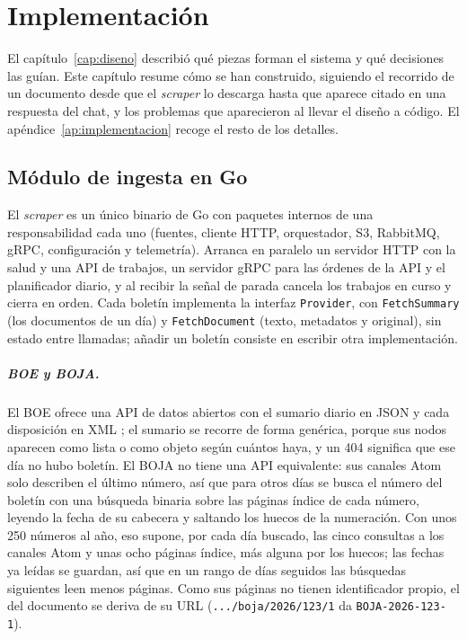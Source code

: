 \chapter{Implementación}
\label{cap:implementacion}

El capítulo~\ref{cap:diseno} describió qué piezas forman el sistema y qué decisiones las guían. Este capítulo resume cómo se han construido, siguiendo el recorrido de un documento desde que el \emph{scraper} lo descarga hasta que aparece citado en una respuesta del chat, y los problemas que aparecieron al llevar el diseño a código. El apéndice~\ref{ap:implementacion} recoge el resto de los detalles.

\section{Módulo de ingesta en Go}
\label{sec:impl-go}

El \emph{scraper} es un único binario de Go \cite{golang} con paquetes internos de una responsabilidad cada uno (fuentes, cliente HTTP, orquestador, S3, RabbitMQ, gRPC, configuración y telemetría). Arranca en paralelo un servidor HTTP con la salud y una API de trabajos, un servidor gRPC para las órdenes de la API y el planificador diario, y al recibir la señal de parada cancela los trabajos en curso y cierra en orden. Cada boletín implementa la interfaz \texttt{Provider}, con \texttt{FetchSummary} (los documentos de un día) y \texttt{FetchDocument} (texto, metadatos y original), sin estado entre llamadas; añadir un boletín consiste en escribir otra implementación.

\paragraph{BOE y BOJA.} El BOE ofrece una API de datos abiertos con el sumario diario en JSON y cada disposición en XML \cite{boedatosabiertos}; el sumario se recorre de forma genérica, porque sus nodos aparecen como lista o como objeto según cuántos haya, y un 404 significa que ese día no hubo boletín. El BOJA no tiene una API equivalente: sus canales Atom solo describen el último número, así que para otros días se busca el número del boletín con una búsqueda binaria sobre las páginas índice de cada número, leyendo la fecha de su cabecera y saltando los huecos de la numeración. Con unos 250 números al año, eso supone, por cada día buscado, las cinco consultas a los canales Atom y unas ocho páginas índice, más alguna por los huecos; las fechas ya leídas se guardan, así que en un rango de días seguidos las búsquedas siguientes leen menos páginas. Como sus páginas no tienen identificador propio, el del documento se deriva de su URL (\texttt{.../boja/2026/123/1} da \texttt{BOJA-2026-123-1}).

